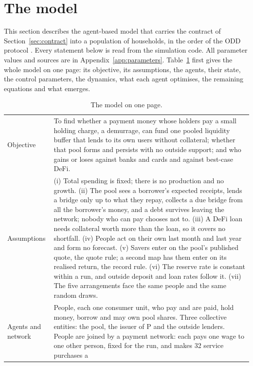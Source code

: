 \section{The model}\label{sec:model}

This section describes the agent-based model that carries the contract of Section~\ref{sec:contract} into a
population of households, in the order of the ODD protocol \cite{grimm}. Every statement below is read from
the simulation code. All parameter values and sources are in Appendix~\ref{app:parameters}.
Table~\ref{tab:onepage} first gives the whole model on one page: its objective, its assumptions,
the agents, their state, the control parameters, the dynamics, what each agent optimises, the remaining
equations and what emerges.

\begin{table}[p]
\centering\footnotesize
\caption{The model on one page.}\label{tab:onepage}
\begin{tabularx}{\textwidth}{@{}p{}X@{}}
\toprule
Objective & To find whether a payment money whose holders pay a small holding charge, a demurrage, can fund one pooled liquidity
  buffer that lends to its own users without collateral; whether that pool forms and persists with no outside
  support; and who gains or loses against banks and cards and against best-case DeFi. \\
\addlinespace
Assumptions & (i) Total spending is fixed; there is no production and no growth.
  (ii) The pool sees a borrower's expected receipts, lends a bridge only up to what they repay, collects a due
  bridge from all the borrower's money, and a debt survives leaving the network; nobody who can pay chooses not to.
  (iii) A DeFi loan needs collateral worth more than the loan, so it covers no shortfall.
  (iv) People act on their own last month and last year and form no forecast.
  (v) Savers enter on the pool's published quote, the quote rule; a second map has them enter on its realised
  return, the record rule.
  (vi) The reserve rate is constant within a run, and outside deposit and loan rates follow it.
  (vii) The five arrangements face the same people and the same random draws. \\
\addlinespace
Agents and network & People, each one consumer unit, who pay and are paid, hold money, borrow and may own pool
  shares. Three collective entities: the pool, the issuer of P and the outside lenders. People are joined by a
  payment network: each pays one wage to one other person, fixed for the run, and makes 32 service purchases a

\end{tabularx}
\end{table}
